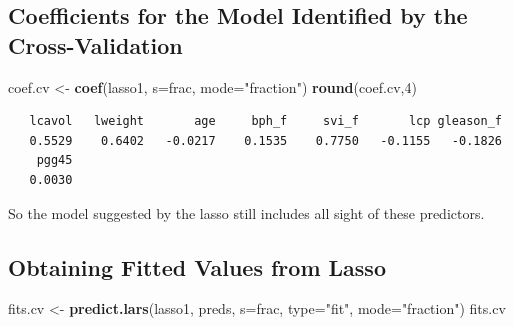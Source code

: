 \documentclass[]{book}
\newenvironment{Shaded}{\begin{snugshade}}{\end{snugshade}}
\newcommand{\KeywordTok}[1]{\textcolor[rgb]{0.13,0.29,0.53}{\textbf{#1}}}
\newcommand{\DataTypeTok}[1]{\textcolor[rgb]{0.13,0.29,0.53}{#1}}
\newcommand{\DecValTok}[1]{\textcolor[rgb]{0.00,0.00,0.81}{#1}}
\newcommand{\StringTok}[1]{\textcolor[rgb]{0.31,0.60,0.02}{#1}}
\newcommand{\NormalTok}[1]{#1}
\theoremstyle{definition}
\theoremstyle{definition}
\theoremstyle{definition}
\theoremstyle{remark}
\begin{document}
\subsection{Coefficients for the Model Identified by the
Cross-Validation}\label{coefficients-for-the-model-identified-by-the-cross-validation}

\begin{Shaded}
\begin{Highlighting}[]
\NormalTok{coef.cv <-}\StringTok{ }\KeywordTok{coef}\NormalTok{(lasso1, }\DataTypeTok{s=}\NormalTok{frac, }\DataTypeTok{mode=}\StringTok{"fraction"}\NormalTok{)}
\KeywordTok{round}\NormalTok{(coef.cv,}\DecValTok{4}\NormalTok{)}
\end{Highlighting}
\end{Shaded}

\begin{verbatim}
   lcavol   lweight       age     bph_f     svi_f       lcp gleason_f 
   0.5529    0.6402   -0.0217    0.1535    0.7750   -0.1155   -0.1826 
    pgg45 
   0.0030 
\end{verbatim}

So the model suggested by the lasso still includes all sight of these
predictors.

\subsection{Obtaining Fitted Values from
Lasso}\label{obtaining-fitted-values-from-lasso}

\begin{Shaded}
\begin{Highlighting}[]
\NormalTok{fits.cv <-}\StringTok{ }\KeywordTok{predict.lars}\NormalTok{(lasso1, preds, }\DataTypeTok{s=}\NormalTok{frac, }
                        \DataTypeTok{type=}\StringTok{"fit"}\NormalTok{, }\DataTypeTok{mode=}\StringTok{"fraction"}\NormalTok{)}
\NormalTok{fits.cv}
\end{Highlighting}
\end{Shaded}
\end{document}
